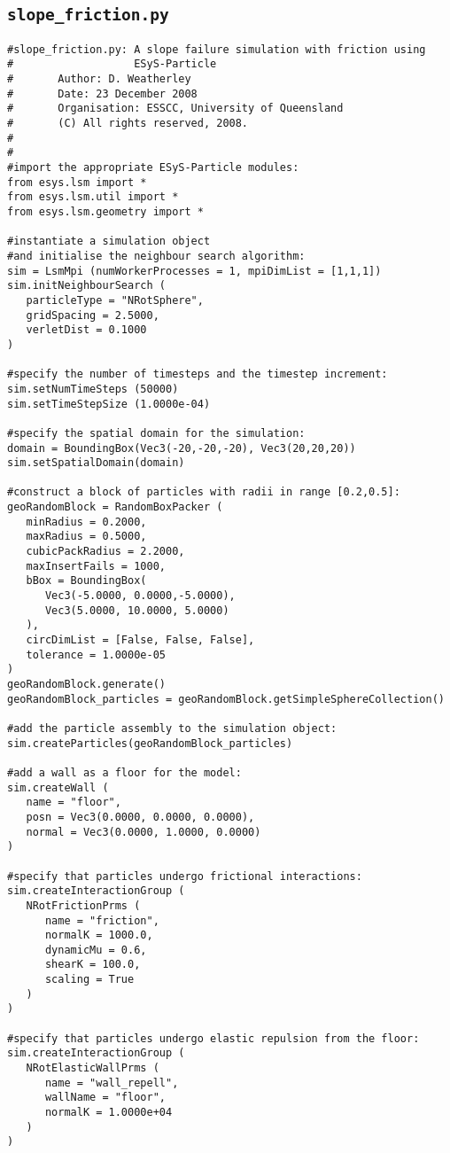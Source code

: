 \subsection{\texttt{slope\_friction.py}}\label{code:slope_friction}
\begin{verbatim}
#slope_friction.py: A slope failure simulation with friction using
#                   ESyS-Particle
#       Author: D. Weatherley
#       Date: 23 December 2008
#       Organisation: ESSCC, University of Queensland
#       (C) All rights reserved, 2008.
#
#
#import the appropriate ESyS-Particle modules:
from esys.lsm import *
from esys.lsm.util import *
from esys.lsm.geometry import *

#instantiate a simulation object 
#and initialise the neighbour search algorithm:
sim = LsmMpi (numWorkerProcesses = 1, mpiDimList = [1,1,1])
sim.initNeighbourSearch (
   particleType = "NRotSphere",
   gridSpacing = 2.5000,
   verletDist = 0.1000
)

#specify the number of timesteps and the timestep increment:
sim.setNumTimeSteps (50000)
sim.setTimeStepSize (1.0000e-04)

#specify the spatial domain for the simulation:
domain = BoundingBox(Vec3(-20,-20,-20), Vec3(20,20,20))
sim.setSpatialDomain(domain)

#construct a block of particles with radii in range [0.2,0.5]:
geoRandomBlock = RandomBoxPacker (
   minRadius = 0.2000,
   maxRadius = 0.5000,
   cubicPackRadius = 2.2000,
   maxInsertFails = 1000,
   bBox = BoundingBox(
      Vec3(-5.0000, 0.0000,-5.0000),
      Vec3(5.0000, 10.0000, 5.0000)
   ),
   circDimList = [False, False, False],
   tolerance = 1.0000e-05
)
geoRandomBlock.generate()
geoRandomBlock_particles = geoRandomBlock.getSimpleSphereCollection()

#add the particle assembly to the simulation object:
sim.createParticles(geoRandomBlock_particles)

#add a wall as a floor for the model:
sim.createWall (
   name = "floor",
   posn = Vec3(0.0000, 0.0000, 0.0000),
   normal = Vec3(0.0000, 1.0000, 0.0000)
)

#specify that particles undergo frictional interactions:
sim.createInteractionGroup (
   NRotFrictionPrms (
      name = "friction",
      normalK = 1000.0,
      dynamicMu = 0.6,
      shearK = 100.0,
      scaling = True
   )
)

#specify that particles undergo elastic repulsion from the floor:
sim.createInteractionGroup (
   NRotElasticWallPrms (
      name = "wall_repell",
      wallName = "floor",
      normalK = 1.0000e+04
   )
)


\end{verbatim}
